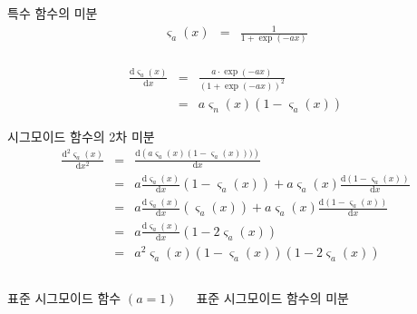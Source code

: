 \documentclass[10pt,t]{beamer}
\begin{document}
\begin{frame}{특수 함수의 미분}
        \begin{eqnarray*}
        \varsigma_a(x) &=&
         \frac{1}{1+\exp(-ax)}\\[0.5em]
        \end{eqnarray*}

         \begin{eqnarray*}
        \frac{\text{d}\varsigma_a(x)}{\text{d}x} &=& \frac{a \cdot \exp(-ax)}{\left(1 + \exp(-ax)\right)^2} \\
        &=& a\varsigma_n(x)\left(1 - \varsigma_a (x)\right)
        \end{eqnarray*}
    
        \pagebreak

    시그모이드 함수의 2차 미분
        \begin{eqnarray*}
        \frac{\text{d}^2\varsigma_a(x)}{\text{d}x^2} &=& \frac{\text{d}\left(a\varsigma_a(x) \left(1 - \varsigma_a(x)\right))\right)}{\text{d}x}\\
        &=&a\frac{\text{d}\varsigma_a(x)}{\text{d}x}\left(1-\varsigma_a(x)\right) + a\varsigma_a(x) \frac{\text{d}\left(1-\varsigma_a(x)\right)}{\text{d}x}\\
        &=&a\frac{\text{d}\varsigma_a(x)}{\text{d}x}\left(\varsigma_a(x)\right) + a\varsigma_a(x) \frac{\text{d}\left(1-\varsigma_a(x)\right)}{\text{d}x}\\
        &=&a\frac{\text{d}\varsigma_a(x)}{\text{d}x}\left(1-2\varsigma_a(x)\right) \\
        &=& a^2\varsigma_a(x)\left(1-\varsigma_a(x)\right)\left(1-2\varsigma_a(x)\right)
    \end{eqnarray*}

    \pagebreak

    \begin{columns}
    표준 시그모이드 함수 $(a = 1)$

    표준 시그모이드 함수의 미분 \\
    \end{columns}


\end{frame}
\end{document}
